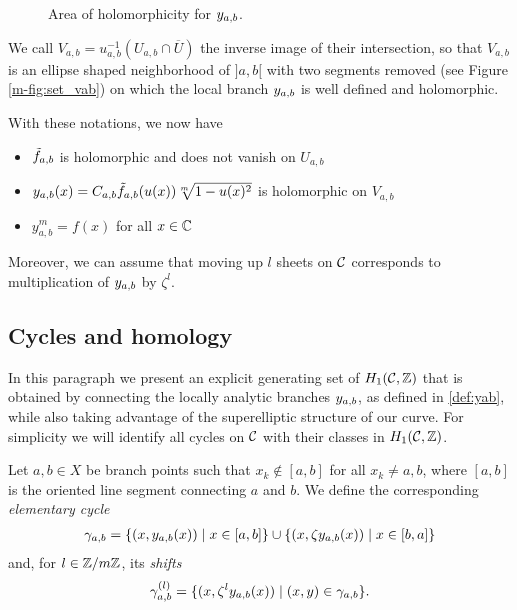 \documentclass[main.tex]{subfiles}
\begin{document}
  \begin{figure}[H] \begin{center} 
  \end{center} \caption{Area of holomorphicity for $y_{a,b}$.}
  \label{fig:set_vab} \end{figure}

  We call $V_{a,b} = u_{a,b}^{-1}(U_{a,b}\cap \overline U)$ the inverse image of their intersection,
  so that $V_{a,b}$ is an ellipse shaped neighborhood of $]a,b[$ with two segments removed
      (see Figure \ref{m-fig:set_vab})
      on which the local branch $y_{a,b}$ is well defined and holomorphic.

  With these notations, we now have
  \begin{prop}
     \begin{itemize}
         \item $\tilde{f}_{a,b}$ is holomorphic and does not vanish on $U_{a,b}$
         \item $y_{a,b}(x) = C_{a,b} \tilde{f}_{a,b}(u(x)) \sqrt[m]{1-u(x)^2}$ is holomorphic
         on $V_{a,b}$
         \item $y_{a,b}^m = f(x)$ for all $x\in\mathbb{C}$
     \end{itemize}
     Moreover, we can assume that moving up $l$ sheets on $\mathcal{C}$
     corresponds to multiplication of $y_{a,b}$ by $\zeta^l$.
 \end{prop}


  \subsection{Cycles and homology}\label{subsec:cycles_homo}

   In this paragraph we present an explicit generating set of $H_1(\mathcal{C},\mathbb{Z})$ that is obtained by connecting the locally analytic branches $y_{a,b}$, as defined in \eqref{def:yab},
   while also taking advantage of the superelliptic structure of our curve.
   For simplicity we will identify all cycles on $\mathcal{C}$ with their classes in $H_1(\mathcal{C},\mathbb{Z})$.

   \begin{defn}\label{def:elem_cycle}
   Let $a, b \in X$ be branch points such that $x_k \not\in [a,b]$ for all $x_k \ne a,b$, where  $[a,b]$ is the oriented line segment connecting $a$ and $b$.
   We define the corresponding \textit{elementary cycle}
   \begin{align}
    \gamma_{a,b} = \{  (x,y_{a,b}(x))  \mid  x \in [a,b]  \} \cup \{ (x,\zeta  y_{a,b}(x))  \mid  x \in [b,a]  \}
   \end{align}
   and, for $l \in \mathbb{Z}/m\mathbb{Z}$, its \textit{shifts}
   \begin{align}
    \gamma_{a,b}^{(l)} = \{  (x,\zeta^l y_{a,b}(x))  \mid  (x,y) \in \gamma_{a,b}  \}.
   \end{align}
    \end{defn}
\end{document}
